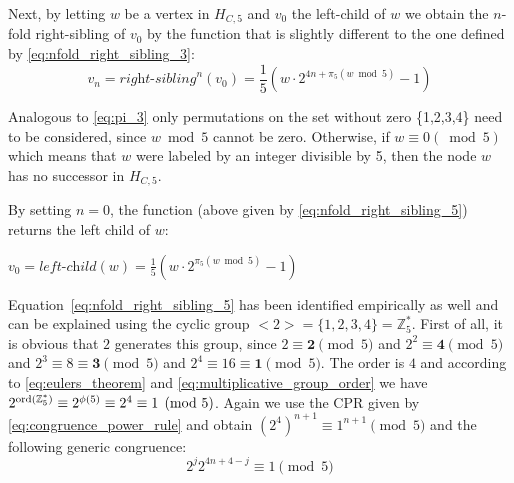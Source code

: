 Next, by letting $w$ be a vertex in $H_{C,5}$ and $v_0$ the left-child of $w$
we obtain the $n$-fold right-sibling of $v_0$ by the function that
is slightly different to the one defined by \ref{eq:nfold_right_sibling_3}:
\begin{equation}
\label{eq:nfold_right_sibling_5}
    v_n=\textit{right-sibling}^n(v_0)=\frac{1}{5}\left(w\cdot2^{4n+\pi_5(w\bmod 5)}-1\right)
\end{equation}

Analogous to \ref{eq:pi_3} only permutations on the set without zero
\{1,2,3,4\} need to be considered, since $w\bmod 5$ cannot be zero.
Otherwise, if $w\equiv 0 (\bmod 5)$ which means that $w$ were labeled
by an integer divisible by 5, then the node $w$ has no successor in $H_{C,5}$.

\noindent
By setting $n=0$, the function (above given by \ref{eq:nfold_right_sibling_5}) returns the left child of $w$:
\begin{center}
	$v_0=\textit{left-child}(w)=\frac{1}{5}\left(w\cdot2^{\pi_5(w\bmod 5)}-1\right)$
\end{center}

Equation~\ref{eq:nfold_right_sibling_5} has been identified empirically as well and can be explained using the cyclic group $<2>=\{1,2,3,4\}=\mathbb{Z}_5^\ast$. First of all, it is obvious that $2$ generates this group, since $2\equiv\boldsymbol{2}\pmod5$ and $2^2\equiv\boldsymbol{4}\pmod5$ and $2^3\equiv8\equiv\boldsymbol{3}\pmod5$ and $2^4\equiv16\equiv\boldsymbol{1}\pmod5$. The order is $4$ and according to \ref{eq:eulers_theorem} and \ref{eq:multiplicative_group_order} we have $2^{\operatorname{ord}(\mathbb{Z}_5^\ast)}\equiv2^{\phi(5)}\equiv2^4\equiv1\pmod5$. Again we use the CPR given by \ref{eq:congruence_power_rule} and obtain $(2^4)^{n+1}\equiv1^{n+1}\pmod5$ and the following generic congruence:
\begin{equation}
\label{eq:congruence_k5}
2^j2^{4n+4-j}\equiv1\pmod5
\end{equation}

